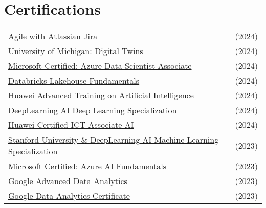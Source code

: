 \documentclass[a4paper,10pt]{article}
\begin{document}
\section{Certifications}
\begin{tabularx}{\linewidth}{@{}l X@{}}
\href{https://balcortex.github.io/assets/certifications/coursera_agile_attlassian_jira.pdf}{Agile with Atlassian Jira} & \hfill (2024) \\
\href{https://balcortex.github.io/assets/certifications/coursera_digital_twins.pdf}{University of Michigan: Digital Twins} & \hfill (2024) \\
\href{https://balcortex.github.io/assets/certifications/microsoft_azure_data_scientist_associate.pdf}{Microsoft Certified: Azure Data Scientist Associate} & \hfill (2024) \\
\href{https://balcortex.github.io/assets/certifications/databricks_lakehouse_fundamentals.pdf}{Databricks Lakehouse Fundamentals} & \hfill (2024) \\
\href{https://balcortex.github.io/assets/certifications/huawei_ia_1000_certificate.pdf}{Huawei Advanced Training on Artificial Intelligence} & \hfill (2024) \\
\href{https://balcortex.github.io/assets/certifications/coursera_deep_learning.pdf}{DeepLearning AI Deep Learning Specialization} & \hfill (2024) \\
\href{https://balcortex.github.io/assets/certifications/huawei_certification.pdf}{Huawei Certified ICT Associate-AI} & \hfill (2024) \\
\href{https://balcortex.github.io/assets/certifications/coursera_machine_learning.pdf}{Stanford University \& DeepLearning AI Machine Learning Specialization} & \hfill (2023) \\
\href{https://balcortex.github.io/assets/certifications/microsoft_azure_ai_fundamentals.pdf}{Microsoft Certified: Azure AI Fundamentals} & \hfill (2023) \\
\href{https://balcortex.github.io/assets/certifications/coursera_google_advanced_data_analytics.pdf}{Google Advanced Data Analytics} & \hfill (2023) \\
\href{https://balcortex.github.io/assets/certifications/coursera_google_data_analytics.pdf}{Google Data Analytics Certificate} & \hfill (2023) \\
\end{tabularx}


\end{document}
